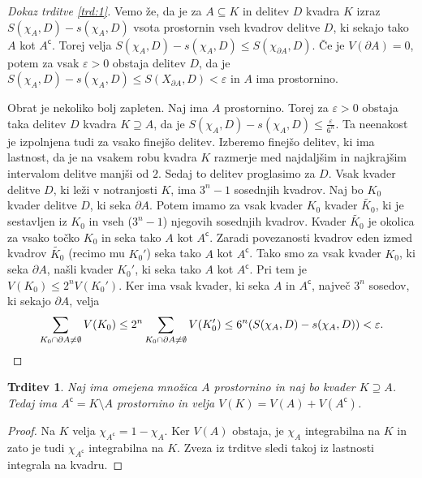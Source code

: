 \documentclass[10pt, a4paper]{article}
\newtheorem{trditev}[izr]{Trditev}
\newenvironment{noticeC}{%
  \tcolorbox[%
  notitle,
  empty,
  enhanced,  %
  breakable,
  coltext=black, 
  fontupper=\rmfamily,
  parbox=false,
  noparskip,
  sharp corners,
  boxrule=-1pt,  %
  frame hidden,
  left=7pt,  %
  right=7pt,
  top=5pt,
  bottom=5pt,
  before skip=2.5ex plus 2pt,
  after skip=2.5ex plus 2pt,
  overlay unbroken and last={%
  },
  ]}
{\endtcolorbox}
\newenvironment{dokaz}%
  {\begin{noticeC}\begin{proof}}%
  {\end{proof}\end{noticeC}}
\newcommand{\stcomp}[1]{{#1}^{\mathsf{c}}}
\begin{document}
\begin{dokaz}[Dokaz trditve \ref{trd:1}]
    Vemo že, da je za $A \subseteq K$ 
in delitev $D$ kvadra $K$ izraz $S(\chi_A, D) - s(\chi_A, D)$
vsota prostornin vseh kvadrov delitve $D$, ki sekajo tako $A$ kot $\stcomp{A}$.
Torej velja $S(\chi_A, D) - s(\chi_A, D) \leq S(\chi_{\partial A}, D)$.
Če je $V(\partial A) = 0$, potem za vsak $\varepsilon > 0$ 
obstaja delitev $D$, da je $S(\chi_A, D) - s(\chi_A, D) \leq S(X_{\partial A}, D) < \varepsilon$
in $A$ ima prostornino.

Obrat je nekoliko bolj zapleten.
Naj ima $A$ prostornino.
Torej za $\varepsilon > 0$ obstaja taka delitev $D$ 
kvadra $K \supseteq A$, da je $S(\chi_A, D) - s(\chi_A, D) \leq \frac{ \varepsilon}{6^n}$.
Ta neenakost je izpolnjena tudi za vsako finejšo delitev.
Izberemo finejšo delitev, ki ima lastnost, da je na vsakem robu 
kvadra $K$ razmerje med najdaljšim in najkrajšim intervalom delitve manjši od $2$.
Sedaj to delitev proglasimo za $D$.
Vsak kvader delitve $D$, ki leži v notranjosti $K$, ima $3^n - 1$
sosednjih kvadrov.
Naj bo $K_0$ kvader delitve $D$, ki seka $\partial A$.
Potem imamo za vsak kvader $K_0$ kvader $\widetilde{K_0}$,
ki je sestavljen iz $K_0$ in vseh ($3^n - 1$) njegovih sosednjih kvadrov.
Kvader $\widetilde{K_0}$ je okolica za vsako točko $K_0$ in seka tako $A$ kot $\stcomp{A}$.
Zaradi povezanosti kvadrov eden izmed kvadrov $\widetilde{K_0}$ (recimo mu $K_0'$)
seka tako $A$ kot $\stcomp{A}$.
Tako smo za vsak kvader $K_0$, ki seka $\partial A$,
našli kvader $K_0'$, ki seka tako $A$ kot $\stcomp{A}$.
Pri tem je $V(K_0) \leq 2^n V(K_0')$.
Ker ima vsak kvader, ki seka $A$ in $\stcomp{A}$, največ $3^n$ sosedov, ki sekajo $\partial A$, velja
\begin{equation*}
    \sum_{K_0 \cap \partial A \neq \emptyset} V(K_0) \leq 2^n \sum_{K_0 \cap \partial A \neq \emptyset} V(K_0') \leq 6^n (S(\chi_A, D) - s(\chi_A, D)) < \varepsilon. \qedhere
\end{equation*}
\end{dokaz}

\begin{trditev}
    Naj ima omejena množica $A$ prostornino in naj bo kvader $K \supseteq A$.
    Tedaj ima $\stcomp{A} = K \setminus A$ prostornino in velja $V(K) = V(A) + V(\stcomp{A})$.
\end{trditev}

\begin{dokaz}
    Na $K$ velja $\chi_{\stcomp{A}} = 1 - \chi_A$.
    Ker $V(A)$ obstaja, je $\chi_A$ integrabilna na $K$
    in zato je tudi $\chi_{\stcomp{A}}$ integrabilna na $K$.
    Zveza iz trditve sledi takoj iz lastnosti integrala na kvadru.
\end{dokaz}
\end{document}
